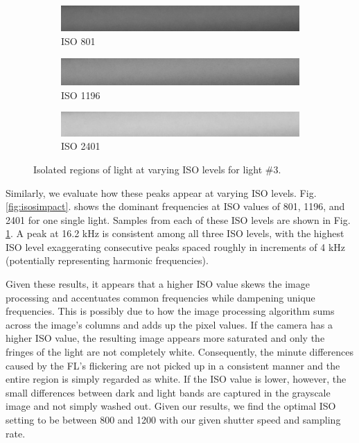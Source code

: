 \documentclass[conference]{IEEEtran}
\begin{document}
\begin{figure}[!h]
	\begin{subfigure}{.33\textwidth}
		\centering
		\includegraphics[width=1\linewidth]{figures/D/801.png}
		\caption{ISO 801}
	\end{subfigure}
	\begin{subfigure}{.33\textwidth}
		\centering
		\includegraphics[width=1\linewidth]{figures/D/1196.png}
		\caption{ISO 1196}
	\end{subfigure}
	\begin{subfigure}{.33\textwidth}
		\centering
		\includegraphics[width=1\linewidth]{figures/D/2401.png}
		\caption{ISO 2401}
	\end{subfigure}
	\caption{Isolated regions of light at varying ISO levels for light \#3.}
	\label{fig:isosexamples}
\end{figure}

Similarly, we evaluate how these peaks appear at varying ISO levels. Fig. \ref{fig:isosimpact}. shows the dominant frequencies at ISO values of 801, 1196, and 2401 for one single light. Samples from each of these ISO levels are shown in Fig. \ref{fig:isosexamples}. A peak at 16.2 kHz is consistent among all three ISO levels, with the highest ISO level exaggerating consecutive peaks spaced roughly in increments of 4 kHz (potentially representing harmonic frequencies).

Given these results, it appears that a higher ISO value skews the image processing and accentuates common frequencies while dampening unique frequencies. This is possibly due to how the image processing algorithm sums across the image's columns and adds up the pixel values. If the camera has a higher ISO value, the resulting image appears more saturated and only the fringes of the light are not completely white. Consequently, the minute differences caused by the FL's flickering are not picked up in a consistent manner and the entire region is simply regarded as white. If the ISO value is lower, however, the small differences between dark and light bands are captured in the grayscale image and not simply washed out. Given our results, we find the optimal ISO setting to be between 800 and 1200 with our given shutter speed and sampling rate.
\end{document}
